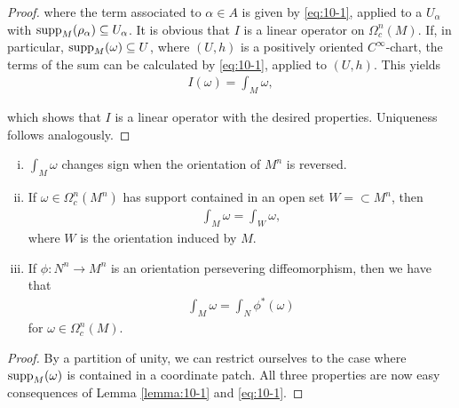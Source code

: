 \begin{proof}
where the term associated to $\alpha\in A$ is given by \eqref{eq:10-1}, applied to a $U_\alpha$ with
$\operatorname{supp}_M(\rho_\alpha)\subseteq U_\alpha$. It is obvious that $I$ is a linear operator on $\Omega^n_c(M)$. If, in
particular, $\operatorname{supp}_M(\omega)\subseteq U$, where $(U, h)$ is a positively oriented $C^\infty$-chart, the
terms of the sum can be calculated by \eqref{eq:10-1}, applied to $(U, h)$. This yields
\begin{align*}
  I(\omega) = \int_M \omega,
\end{align*}

which shows that $I$ is a linear operator with the desired properties. Uniqueness
follows analogously.
\end{proof}

\begin{lemma}\label{lemma:10-3}\;\par 
  \begin{enumerate}[(i)]
    \item $\int_M\omega$ changes sign when the orientation of $M^n$ is reversed.
    \item If $\omega\in\Omega^n_c(M^n)$ has support contained in an open set $W=\subset M^n$, then 
      \begin{align*}
        \int_M\omega = \int_W\omega,
      \end{align*}
      where $W$ is the orientation induced by $M$.
    \item If $\phi:N^n\to M^n$ is an orientation persevering diffeomorphism, then we have that 
      \begin{align*}
        \int_M\omega = 
        \int_N\phi^*(\omega)
      \end{align*}
      for $\omega\in\Omega^n_c(M)$.
  \end{enumerate}
\end{lemma}

\begin{proof}
  By a partition of unity, we can restrict ourselves to the case where
$\operatorname{supp}_M(\omega)$ is contained in a coordinate patch. All three properties are now easy
consequences of Lemma \ref{lemma:10-1} and \eqref{eq:10-1}.
\end{proof}

